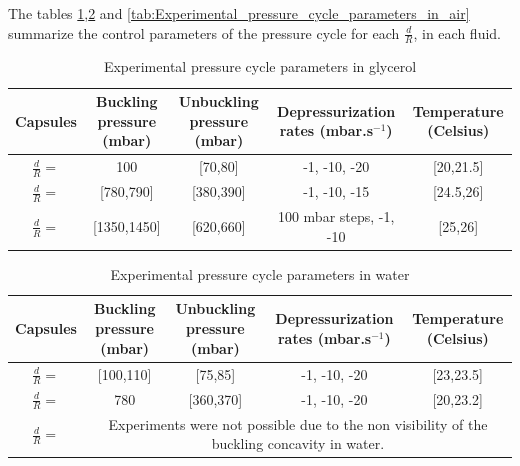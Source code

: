 The tables \ref{tab:Experimental_pressure_cycle_parameters_in_glycerol},\ref{tab:Experimental_pressure_cycle_parameters_in_water} and \ref{tab:Experimental_pressure_cycle_parameters_in_air} summarize the control parameters of the pressure cycle for each $\frac{d}{R}$, in each fluid.
\begin{table}[H]
	\centering
		\begin{adjustbox}{width=\textwidth}
			\begin{tabular}{|c|c|c|c|c|}
				\hline
				Capsules & Buckling pressure (mbar) & Unbuckling pressure (mbar) & Depressurization rates (mbar.s$^{-1}$) & Temperature (Celsius) \\
				\hline
				$\frac{d}{R} = $ & 100 & [70,80] & -1, -10, -20 & [20,21.5]\\
				\hline
				$\frac{d}{R} = $ & [780,790] & [380,390] & -1, -10, -15 & [24.5,26]\\
				\hline
				$\frac{d}{R} = $ & [1350,1450] & [620,660] & 100 mbar steps, -1, -10 & [25,26]\\
				\hline
			\end{tabular}
		\end{adjustbox}
	
	\caption{Experimental pressure cycle parameters in glycerol}
	\label{tab:Experimental_pressure_cycle_parameters_in_glycerol}
\end{table}

\begin{table}[H]
	\centering
		\begin{adjustbox}{width=\textwidth}
			\begin{tabular}{|c|c|c|c|c|}
				\hline
				Capsules & Buckling pressure (mbar) & Unbuckling pressure (mbar) & Depressurization rates (mbar.s$^{-1}$) & Temperature (Celsius) \\
				\hline
				$\frac{d}{R} = $ & [100,110]& [75,85] & -1, -10, -20 & [23,23.5]\\
				\hline
				$\frac{d}{R} = $ & 780 & [360,370] & -1, -10, -20 & [20,23.2]\\
				\hline
				$\frac{d}{R} = $ &  \multicolumn{4}{c|}{Experiments were not possible due to the non visibility of the buckling concavity in water.}\\
				\hline
			\end{tabular}
		\end{adjustbox}
	
	\caption{Experimental pressure cycle parameters in water}
	\label{tab:Experimental_pressure_cycle_parameters_in_water}
\end{table}

